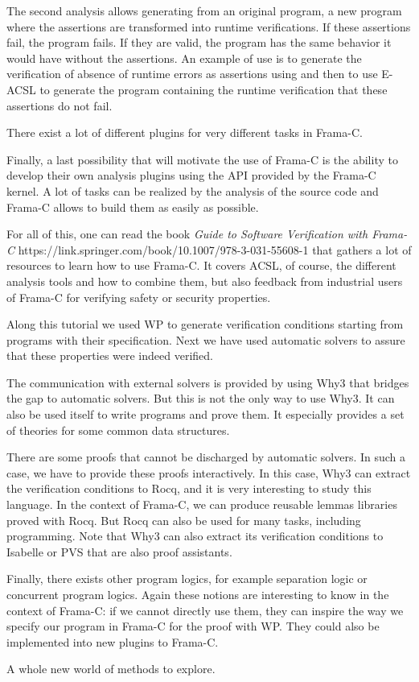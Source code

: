 The second analysis allows generating from an original program, a new
program where the assertions are transformed into runtime verifications.
If these assertions fail, the program fails. If they are valid, the
program has the same behavior it would have without the assertions. An
example of use is to generate the verification of absence of runtime
errors as assertions using  and then to use E-ACSL to
generate the program containing the runtime verification that these
assertions do not fail.

There exist a lot of different plugins for very different tasks in Frama-C.

Finally, a last possibility that will motivate the use of Frama-C is the
ability to develop their own analysis plugins using the API provided by
the Frama-C kernel. A lot of tasks can be realized by the analysis of
the source code and Frama-C allows to build them as easily as possible.


For all of this, one can read the book
\externalLink
{\textit{Guide to Software Verification with Frama-C}}
{https://link.springer.com/book/10.1007/978-3-031-55608-1}
that gathers a lot of resources to learn how to use Frama-C. It covers ACSL, of
course, the different analysis tools and how to combine them, but also
feedback from industrial users of Frama-C for verifying safety or security
properties.




Along this tutorial we used WP to generate verification conditions starting
from programs with their specification. Next we have used automatic
solvers to assure that these properties were indeed verified.

The communication with external solvers is provided by using Why3 that
bridges the gap to automatic solvers. But this is not the
only way to use Why3. It can also be used itself to write programs and
prove them. It especially provides a set of theories for some common
data structures.

There are some proofs that cannot be discharged by automatic solvers. In
such a case, we have to provide these proofs interactively. In this case,
Why3 can extract the verification conditions to Rocq, and it is very
interesting to study
this language. In the context of Frama-C, we can produce reusable lemmas
libraries proved with Rocq. But Rocq can also be used for many
tasks, including programming. Note that Why3 can also extract
its verification conditions to Isabelle or PVS that are also proof assistants.

Finally, there exists other program logics, for example separation logic
or concurrent program logics. Again these notions are interesting to know
in the context of Frama-C: if we cannot directly use them, they can
inspire the way we specify our program in Frama-C for the proof with WP.
They could also be implemented into new plugins to Frama-C.

A whole new world of methods to explore.
